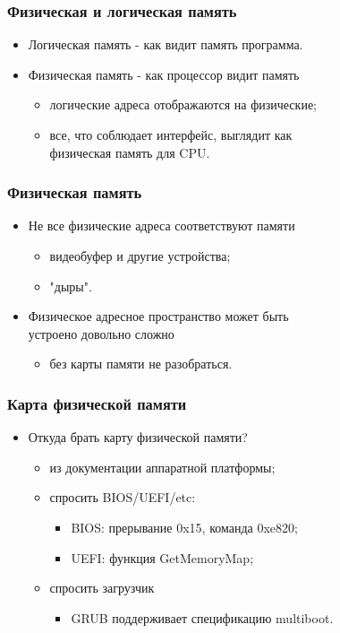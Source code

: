 \begin{frame}
\frametitle{Физическая и логическая память}
\begin{itemize}
    \item<1-> Логическая память - как видит память программа.
    \item<2-> Физическая память - как процессор видит память
    \begin{itemize}
        \item<3-> логические адреса отображаются на физические;
        \item<4-> все, что соблюдает интерфейс, выглядит как \\
        физическая память для CPU.
    \end{itemize}
\end{itemize}
\end{frame}

\begin{frame}
\frametitle{Физическая память}
\begin{itemize}
    \item<1-> Не все физические адреса соответствуют памяти
    \begin{itemize}
        \item<1-> видеобуфер и другие устройства;
        \item<2-> "дыры".
    \end{itemize}
    \item<3-> Физическое адресное пространство может быть \\
    устроено довольно сложно
    \begin{itemize}
        \item без карты памяти не разобраться.
    \end{itemize}
\end{itemize}
\end{frame}

\begin{frame}
\frametitle{Карта физической памяти}
\begin{itemize}
    \item<1->Откуда брать карту физической памяти?
    \begin{itemize}
        \item<2->из документации аппаратной платформы;
        \item<3->спросить BIOS/UEFI/etc:
        \begin{itemize}
            \item BIOS: прерывание 0x15, команда 0xe820;
            \item UEFI: функция GetMemoryMap;
        \end{itemize}
        \item<4->спросить загрузчик
        \begin{itemize}
            \item GRUB поддерживает спецификацию multiboot.
        \end{itemize}
    \end{itemize}
\end{itemize}
\end{frame}

